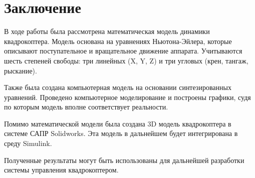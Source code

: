 \chapter*{Заключение}
\label{ch:chap1}

В ходе работы была рассмотрена математическая модель динамики квадрокоптера.
Модель основана на уравнениях Ньютона-Эйлера, 
которые описывают поступательное и вращательное движение аппарата. 
Учитываются шесть степеней свободы: три линейных (X, Y, Z) 
и три угловых (крен, тангаж, рыскание).

Также была создана компьютерная модель на основании синтезированных уравнений.
Проведено компьютерное моделирование и построены графики, судя по которым 
модель вполне соответствует реальности.

Помимо математической модели была создана 3D модель квадрокоптера в системе
САПР Solidworks. Эта модель в дальнейшем будет интегрирована в 
среду Simulink.

Полученные результаты могут быть использованы для 
дальнейшей разработки системы управления квадрокоптером.

\endinput